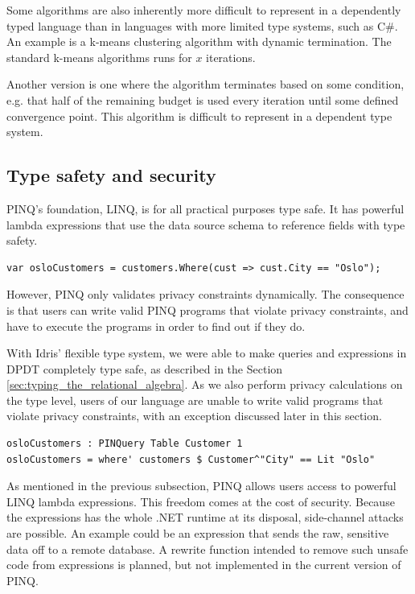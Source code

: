 \documentclass[12pt]{article}
\begin{document}
Some algorithms are also inherently more difficult to represent in a dependently typed language than in languages with more limited type systems, such as C\#.
An example is a k-means clustering algorithm with dynamic termination.
The standard k-means algorithms runs for $x$ iterations.

Another version is one where the algorithm terminates based on some condition, e.g. that half of the remaining budget is used every iteration until some defined convergence point.
This algorithm is difficult to represent in a dependent type system. %

\subsection{Type safety and security}

PINQ's foundation, LINQ, is for all practical purposes type safe.
It has powerful lambda expressions that use the data source schema to reference fields with type safety.

\begin{lstlisting}[caption = Where query in LINQ, captionpos=b]
var osloCustomers = customers.Where(cust => cust.City == "Oslo"); 
\end{lstlisting}

However, PINQ only validates privacy constraints dynamically.
The consequence is that users can write valid PINQ programs that violate privacy constraints, and have to execute the programs in order to find out if they do.

With Idris' flexible type system, we were able to make queries and expressions in DPDT completely type safe, as described in the Section \ref{sec:typing_the_relational_algebra}.
As we also perform privacy calculations on the type level, users of our language are unable to write valid programs that violate privacy constraints, with an exception discussed later in this section.

\begin{lstlisting}[caption = Where query in DPDT, captionpos=b]
osloCustomers : PINQuery Table Customer 1
osloCustomers = where' customers $ Customer^"City" == Lit "Oslo"
\end{lstlisting}

As mentioned in the previous subsection, PINQ allows users access to powerful LINQ lambda expressions.
This freedom comes at the cost of security.
Because the expressions has the whole .NET runtime at its disposal, side-channel attacks are possible.
An example could be an expression that sends the raw, sensitive data off to a remote database.
A rewrite function intended to remove such unsafe code from expressions is planned, but not implemented in the current version of PINQ.
\end{document}
